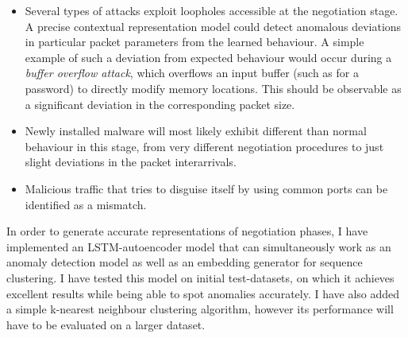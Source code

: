 \documentclass[a4paper,12pt,twoside]{article}
\begin{document}
\begin{itemize}
\item Several types of attacks exploit loopholes accessible at the negotiation stage. A precise contextual representation model could detect anomalous deviations in particular packet parameters from the learned behaviour. A simple example of such a deviation from expected behaviour would occur during a \textit{buffer overflow attack}, which overflows an input buffer (such as for a password) to directly modify memory locations. This should be observable as a significant deviation in the corresponding packet size.

\item Newly installed malware will most likely exhibit different than normal behaviour in this stage, from very different negotiation procedures to just slight deviations in the packet interarrivals.


\item Malicious traffic that tries to disguise itself by using common ports can be identified as a mismatch.


\end{itemize}

In order to generate accurate representations of negotiation phases, I have implemented an LSTM-autoencoder model that can simultaneously work as an anomaly detection model as well as an embedding generator for sequence clustering. I have tested this model on initial test-datasets, on which it achieves excellent results while being able to spot anomalies accurately. I have also added a simple k-nearest neighbour clustering algorithm, however its performance will have to be evaluated on a larger dataset. 
\end{document}
